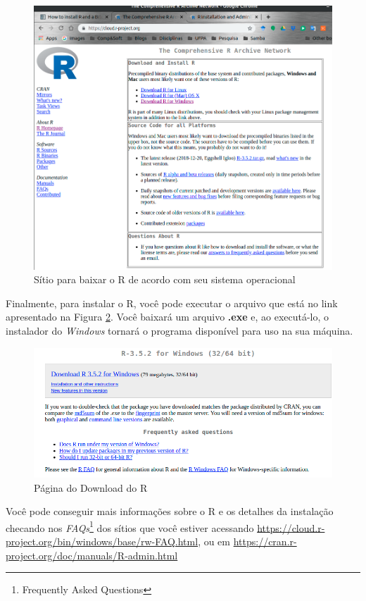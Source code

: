 \documentclass[12pt,a4paper,oneside]{erdc}
\begin{document}
\begin{figure}[htpb]
	\centering
	\includegraphics[width=\linewidth]{../figs/BP_Curso_TecComp_00_2019_f02-03}
	\caption{Sítio para baixar o R de acordo com seu sistema operacional}
	\label{fig:f02-03}
\end{figure}


Finalmente, para instalar o R, você pode executar o arquivo que está no link apresentado na Figura \ref{fig:f02-04}. Você baixará um arquivo \textbf{.exe} e, ao executá-lo, o instalador do \textit{Windows} tornará o programa disponível para uso na sua máquina. 

\begin{figure}[htpb]
	\centering
	\includegraphics[width=\linewidth]{../figs/BP_Curso_TecComp_00_2019_f02-04}
	\caption{Página do Download do R}
	\label{fig:f02-04}
\end{figure}


Você pode conseguir mais informações sobre o R e os detalhes da instalação checando nos \textit{FAQs}\footnote{Frequently Asked Questions} dos sítios que você estiver acessando \url{https://cloud.r-project.org/bin/windows/base/rw-FAQ.html}, ou em \url{https://cran.r-project.org/doc/manuals/R-admin.html}
\end{document}
